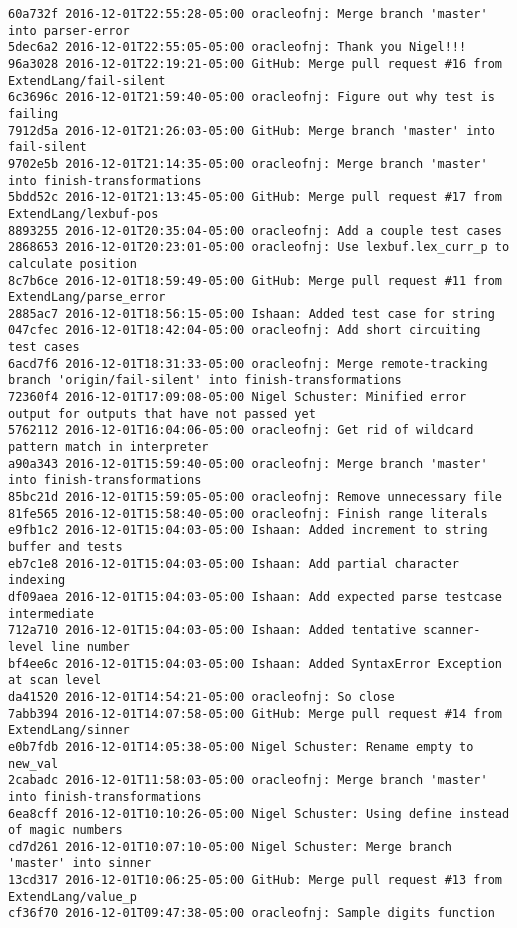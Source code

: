 \begin{lstlisting}
60a732f 2016-12-01T22:55:28-05:00 oracleofnj: Merge branch 'master' into parser-error
5dec6a2 2016-12-01T22:55:05-05:00 oracleofnj: Thank you Nigel!!!
96a3028 2016-12-01T22:19:21-05:00 GitHub: Merge pull request #16 from ExtendLang/fail-silent
6c3696c 2016-12-01T21:59:40-05:00 oracleofnj: Figure out why test is failing
7912d5a 2016-12-01T21:26:03-05:00 GitHub: Merge branch 'master' into fail-silent
9702e5b 2016-12-01T21:14:35-05:00 oracleofnj: Merge branch 'master' into finish-transformations
5bdd52c 2016-12-01T21:13:45-05:00 GitHub: Merge pull request #17 from ExtendLang/lexbuf-pos
8893255 2016-12-01T20:35:04-05:00 oracleofnj: Add a couple test cases
2868653 2016-12-01T20:23:01-05:00 oracleofnj: Use lexbuf.lex_curr_p to calculate position
8c7b6ce 2016-12-01T18:59:49-05:00 GitHub: Merge pull request #11 from ExtendLang/parse_error
2885ac7 2016-12-01T18:56:15-05:00 Ishaan: Added test case for string
047cfec 2016-12-01T18:42:04-05:00 oracleofnj: Add short circuiting test cases
6acd7f6 2016-12-01T18:31:33-05:00 oracleofnj: Merge remote-tracking branch 'origin/fail-silent' into finish-transformations
72360f4 2016-12-01T17:09:08-05:00 Nigel Schuster: Minified error output for outputs that have not passed yet
5762112 2016-12-01T16:04:06-05:00 oracleofnj: Get rid of wildcard pattern match in interpreter
a90a343 2016-12-01T15:59:40-05:00 oracleofnj: Merge branch 'master' into finish-transformations
85bc21d 2016-12-01T15:59:05-05:00 oracleofnj: Remove unnecessary file
81fe565 2016-12-01T15:58:40-05:00 oracleofnj: Finish range literals
e9fb1c2 2016-12-01T15:04:03-05:00 Ishaan: Added increment to string buffer and tests
eb7c1e8 2016-12-01T15:04:03-05:00 Ishaan: Add partial character indexing
df09aea 2016-12-01T15:04:03-05:00 Ishaan: Add expected parse testcase intermediate
712a710 2016-12-01T15:04:03-05:00 Ishaan: Added tentative scanner-level line number
bf4ee6c 2016-12-01T15:04:03-05:00 Ishaan: Added SyntaxError Exception at scan level
da41520 2016-12-01T14:54:21-05:00 oracleofnj: So close
7abb394 2016-12-01T14:07:58-05:00 GitHub: Merge pull request #14 from ExtendLang/sinner
e0b7fdb 2016-12-01T14:05:38-05:00 Nigel Schuster: Rename empty to new_val
2cabadc 2016-12-01T11:58:03-05:00 oracleofnj: Merge branch 'master' into finish-transformations
6ea8cff 2016-12-01T10:10:26-05:00 Nigel Schuster: Using define instead of magic numbers
cd7d261 2016-12-01T10:07:10-05:00 Nigel Schuster: Merge branch 'master' into sinner
13cd317 2016-12-01T10:06:25-05:00 GitHub: Merge pull request #13 from ExtendLang/value_p
cf36f70 2016-12-01T09:47:38-05:00 oracleofnj: Sample digits function

\end{lstlisting}
